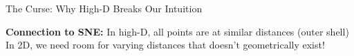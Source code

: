 \documentclass[aspectratio=169]{beamer}
\begin{document}
\begin{frame}{The Curse: Why High-D Breaks Our Intuition}
\vspace{3mm}
\begin{center}
\colorbox{orange!20}{\parbox{0.9\textwidth}{\centering
\textbf{Connection to SNE:} In high-D, all points are at similar distances (outer shell)\\
In 2D, we need room for varying distances that doesn't geometrically exist!}}
\end{center}
\end{frame}
\end{document}

